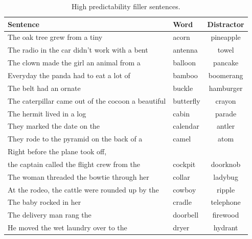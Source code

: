 \begin{table}[!h]
\caption{High predictability filler sentences.}
\label{tbl:senthighfiller}
\small
\centering
\begin{tabular}{llc}
\toprule
Sentence                                                                     & Word        & Distractor  \\
\midrule
The oak tree grew from a tiny                                                & acorn       & pineapple   \\
The radio in the car didn't work with a bent                                 & antenna     & towel       \\
The clown made the girl an animal from a                                     & balloon     & pancake     \\
Everyday the panda had to eat a lot of                                       & bamboo      & boomerang   \\
The belt had an ornate                                                       & buckle      & hamburger   \\
The caterpillar came out of the cocoon a beautiful                           & butterfly   & crayon      \\
The hermit lived in a log                                                    & cabin       & parade      \\
They marked the date on the                                                  & calendar    & antler      \\
They rode to the pyramid on the back of a                                    & camel       & atom        \\
Right before the plane took off,  & & \\
the captain called the flight crew from the & cockpit     & doorknob    \\
The woman threaded the bowtie through her                                    & collar      & ladybug     \\
At the rodeo, the cattle were rounded up by the                              & cowboy      & ripple      \\
The baby rocked in her                                                       & cradle      & telephone   \\
The delivery man rang the                                                    & doorbell    & firewood    \\
He moved the wet laundry over to the                                         & dryer       & hydrant     \\

\end{tabular}
\end{table}
